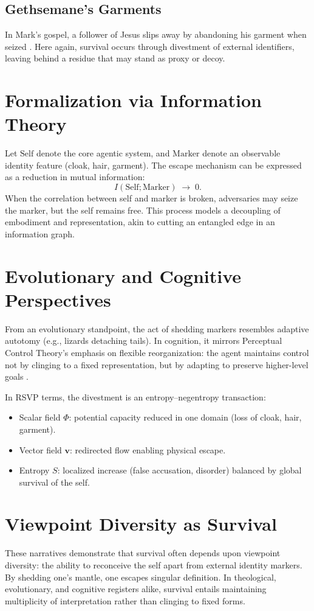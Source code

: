 \documentclass[a4paper,11pt,openany]{book}
\begin{document}
\subsection*{Gethsemane’s Garments}
In Mark’s gospel, a follower of Jesus slips away by abandoning his garment when seized \citep{bibleMark}. Here again, survival occurs through divestment of external identifiers, leaving behind a residue that may stand as proxy or decoy.

\section{Formalization via Information Theory}
Let \(\text{Self}\) denote the core agentic system, and \(\text{Marker}\) denote an observable identity feature (cloak, hair, garment). The escape mechanism can be expressed as a reduction in mutual information:
\[
I(\text{Self}; \text{Marker}) \;\to\; 0.
\]
When the correlation between self and marker is broken, adversaries may seize the marker, but the self remains free. This process models a decoupling of embodiment and representation, akin to cutting an entangled edge in an information graph.

\section{Evolutionary and Cognitive Perspectives}
From an evolutionary standpoint, the act of shedding markers resembles adaptive autotomy (e.g., lizards detaching tails). In cognition, it mirrors Perceptual Control Theory’s emphasis on flexible reorganization: the agent maintains control not by clinging to a fixed representation, but by adapting to preserve higher-level goals \citep{friston2010freeenergy}.

In RSVP terms, the divestment is an entropy–negentropy transaction:
\begin{itemize}
  \item Scalar field \(\Phi\): potential capacity reduced in one domain (loss of cloak, hair, garment).
  \item Vector field \(\mathbf{v}\): redirected flow enabling physical escape.
  \item Entropy \(S\): localized increase (false accusation, disorder) balanced by global survival of the self.
\end{itemize}

\section{Viewpoint Diversity as Survival}
These narratives demonstrate that survival often depends upon viewpoint diversity: the ability to reconceive the self apart from external identity markers. By shedding one’s mantle, one escapes singular definition. In theological, evolutionary, and cognitive registers alike, survival entails maintaining multiplicity of interpretation rather than clinging to fixed forms.
\end{document}
